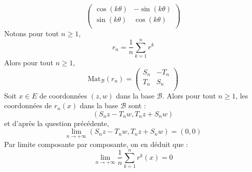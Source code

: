 \documentclass[a4paper,10pt]{report}
\begin{document}
\begin{enumerate}
\begin{itemize}
$$\begin{pmatrix}
\cos(k\theta) & - \sin(k\theta) \\
\sin(k\theta) & \cos(k\theta) \\
\end{pmatrix}$$
Notons pour tout $n \geq 1$,
$$ r_n = \dfrac{1}{n} \sum_{k=1}^n r^k$$
Alors pour tout $n \geq 1$,
$$ \textrm{Mat}_{\mathcal{B}}(r_n) = \begin{pmatrix}
S_n & -T_n \\
T_n & S_n \\
\end{pmatrix}$$
Soit $x \in E$ de coordonnées $(z,w)$ dans la base $\mathcal{B}$. Alors pour tout $n \geq 1$, les coordonnées de $r_n(x)$ dans la base $\mathcal{B}$ sont :
$$ (S_n z - T_n w, T_n z + S_n w)$$
et d'après la question précédente, 
$$ \lim_{n \rightarrow + \infty} (S_n z - T_n w, T_n z + S_n w) = (0,0)$$
Par limite composante par composante, on en déduit que :
$$ \lim_{n \rightarrow + \infty} \dfrac{1}{n} \sum_{k=1}^n r^k(x) = 0$$


\end{itemize}
\end{enumerate}
\end{document}
